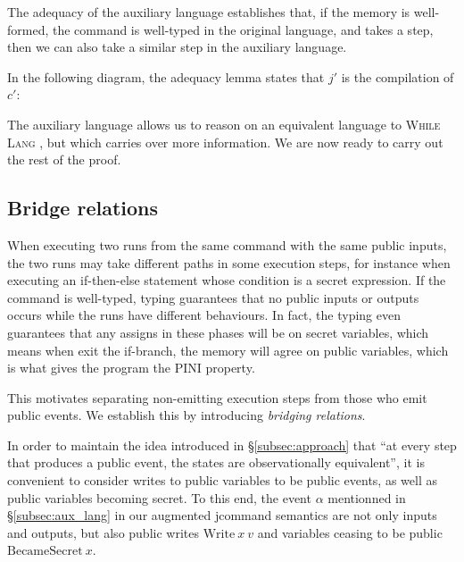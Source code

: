 \documentclass[10pt]{article}
\newcommand{\whilelang}{\textsc{While Lang} }
\newcommand{\compile}[1]{#1\!\downarrow\ }
\begin{document}
The adequacy of the auxiliary language establishes that, if the memory is well-formed, the
command is well-typed in the original language, and takes a step, then we can also take a similar
step in the auxiliary language.

In the following diagram, the adequacy lemma states that $j'$ is the compilation of $c'$:

\begin{center}
\end{center}

The auxiliary language allows us to reason on an equivalent language to \whilelang, but which
carries over more information. We are now ready to carry out the rest of the proof.

\subsection{Bridge relations}%
\label{subsec:bridge_rel}

When executing two runs from the same command with the same public inputs, the two runs may take different paths in some execution steps, for instance when executing an if-then-else statement whose condition is a secret expression. If the command is well-typed, typing guarantees that no public inputs or outputs occurs while the runs have different behaviours. In fact, the typing even guarantees that any assigns in these phases will be on secret variables, which means when exit the if-branch, the memory will agree on public variables, which is what gives the program the PINI property.

This motivates separating non-emitting execution steps from those who emit public events.
We establish this by introducing \emph{bridging relations}.

In order to maintain the idea introduced in \S\ref{subsec:approach} that ``at every step that produces a public event, the states are observationally equivalent'', it is convenient to consider writes to public variables to be public events, as well as public variables becoming secret. To this end, the event \( \alpha \) mentionned in \S\ref{subsec:aux_lang} in our augmented jcommand semantics are not only inputs and outputs, but also public writes \( \mathrm{Write}~x~v \) and variables ceasing to be public \( \mathrm{BecameSecret}~x \).
\end{document}
